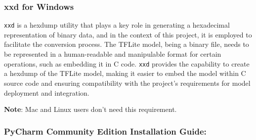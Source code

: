 \subsubsection{xxd for Windows}

\texttt{xxd} is a hexdump utility that plays a key role in generating a hexadecimal representation of binary data, and in the context of this project, it is employed to facilitate the conversion process. The TFLite model, being a binary file, needs to be represented in a human-readable and manipulable format for certain operations, such as embedding it in C code. \texttt{xxd} provides the capability to create a hexdump of the TFLite model, making it easier to embed the model within C source code and ensuring compatibility with the project's requirements for model deployment and integration.

\textbf{Note}: Mac and Linux users don't need this requirement.

\subsubsection{PyCharm Community Edition Installation Guide:}


